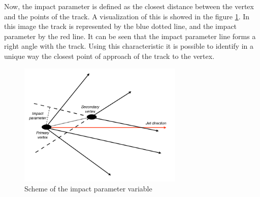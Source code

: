 Now, the impact parameter is defined as the closest distance between the vertex and the points of the track. A visualization of this is showed in the figure \ref{Impact_parameter}. In this image the track is represented by the blue dotted line, and the impact parameter by the red line. It can be seen that the impact parameter line forms a right angle with the track. Using this characteristic it is possible to identify in a unique way the closest point of approach of the track to the vertex.


 \begin{figure}[h] \label{Impact_parameter}
 \centering
 \caption{Scheme of the impact parameter variable}
 \includegraphics[width=0.7\textwidth]{./Capitulos/VariableDefinitions/Impact_parameter}  
 \end{figure} 

 
 
 
 
 
 
 
 
 
 
 
 
 
 
 
 
 
 
 